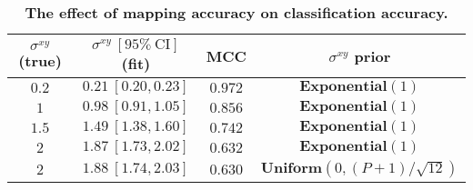 \begin{table}[]
\caption{\label{tab:proximity} \textbf{The effect of mapping accuracy on classification accuracy.}}
\begin{tabular}{cccc}
    \toprule
    $\sigma^{xy}$ (true) & $\sigma^{xy} \: [95\% \: \text{CI}]$ (fit) & MCC & $\sigma^{xy}$ prior \\
    \midrule
    $0.2$ & $0.21 \: [0.20, 0.23]$ & $0.972$ & $\mathbf{Exponential}(1)$ \\
    $1$ & $0.98 \: [0.91, 1.05]$ & $0.856$ & $\mathbf{Exponential}(1)$ \\
    $1.5$ & $1.49 \: [1.38, 1.60]$ & $0.742$ & $\mathbf{Exponential}(1)$ \\
    $2$ & $1.87 \: [1.73, 2.02]$ & $0.632$ & $\mathbf{Exponential}(1)$ \\
    $2$ & $1.88 \: [1.74, 2.03]$ & $0.630$ & $\mathbf{Uniform}(0, (P+1) / \sqrt{12})$ \\
    \bottomrule
\end{tabular}
\end{table}